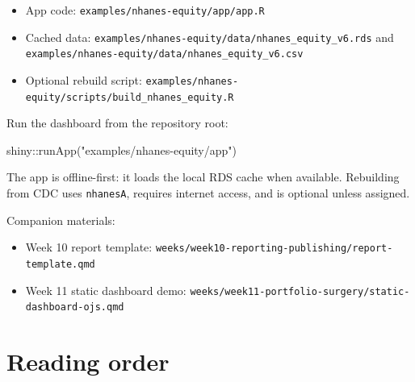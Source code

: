 \documentclass[
  letterpaper,
  DIV=11,
  numbers=noendperiod,
  oneside]{scrreprt}
\newenvironment{Shaded}{\begin{snugshade}}{\end{snugshade}}
\newcommand{\FunctionTok}[1]{\textcolor[rgb]{0.28,0.35,0.67}{#1}}
\newcommand{\NormalTok}[1]{\textcolor[rgb]{0.00,0.23,0.31}{#1}}
\newcommand{\SpecialCharTok}[1]{\textcolor[rgb]{0.37,0.37,0.37}{#1}}
\newcommand{\StringTok}[1]{\textcolor[rgb]{0.13,0.47,0.30}{#1}}
\providecommand{\tightlist}{%
  \setlength{\itemsep}{0pt}\setlength{\parskip}{0pt}}
\begin{document}
\begin{itemize}
\tightlist
\item
  App code: \texttt{examples/nhanes-equity/app/app.R}
\item
  Cached data:
  \texttt{examples/nhanes-equity/data/nhanes\_equity\_v6.rds} and
  \texttt{examples/nhanes-equity/data/nhanes\_equity\_v6.csv}
\item
  Optional rebuild script:
  \texttt{examples/nhanes-equity/scripts/build\_nhanes\_equity.R}
\end{itemize}

Run the dashboard from the repository root:

\begin{Shaded}
\begin{Highlighting}[numbers=left,,]
\NormalTok{shiny}\SpecialCharTok{::}\FunctionTok{runApp}\NormalTok{(}\StringTok{"examples/nhanes{-}equity/app"}\NormalTok{)}
\end{Highlighting}
\end{Shaded}

The app is offline-first: it loads the local RDS cache when available.
Rebuilding from CDC uses \texttt{nhanesA}, requires internet access, and
is optional unless assigned.

Companion materials:

\begin{itemize}
\tightlist
\item
  Week 10 report template:
  \texttt{weeks/week10-reporting-publishing/report-template.qmd}
\item
  Week 11 static dashboard demo:
  \texttt{weeks/week11-portfolio-surgery/static-dashboard-ojs.qmd}
\end{itemize}

\section*{Reading order}\label{reading-order-2}

\end{document}
